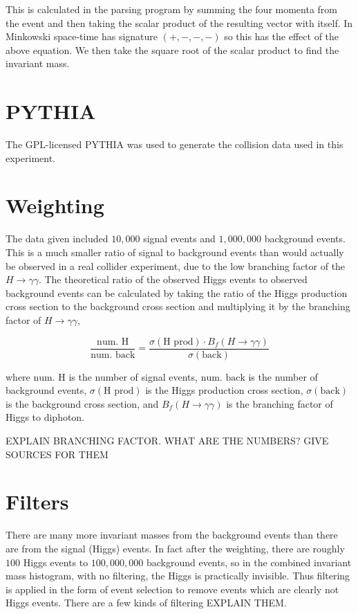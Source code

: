 \documentclass[11pt]{amsart}
\begin{document}
\begin{multicols}{2}
This is calculated in the parsing program by summing the four momenta from the event and then taking the scalar product of the resulting vector with itself. In Minkowski space-time has signature $(+, -, -, -)$ so this has the effect of the above equation. We then take the square root of the scalar product to find the invariant mass.

\section{PYTHIA}

The GPL-licensed PYTHIA was used to generate the collision data used in this experiment. \cite{pythia}

\section{Weighting}

The data given included $10,000$ signal events and $1,000,000$ background events. This is a much smaller ratio of signal to background events than would actually be observed in a real collider experiment, due to the low branching factor of the $H \to \gamma\gamma$. The theoretical ratio of the observed Higgs events to observed background events can be calculated by taking the ratio of the Higgs production cross section to the background cross section and multiplying it by the branching factor of $H \to \gamma\gamma$,

\begin{equation}
  \label{eq:weighting}
  \frac{\text{num. H}}{\text{num. back}} = \frac{\sigma{\left(\text{H prod}\right)} \cdot B_f\left(H\to\gamma\gamma\right)}{\sigma{\left(\text{back}\right)}}
\end{equation}

where $\text{num. H}$ is the number of signal events, $\text{num. back}$ is the number of background events, $\sigma{\left(\text{H prod}\right)}$ is the Higgs production cross section, $\sigma{\left(\text{back}\right)}$ is the background cross section, and $B_f\left(H\to\gamma\gamma\right)$ is the branching factor of Higgs to diphoton.

EXPLAIN BRANCHING FACTOR. WHAT ARE THE NUMBERS? GIVE SOURCES FOR THEM


\section{Filters}

There are many more invariant masses from the background events than there are from the signal (Higgs) events. In fact after the weighting, there are roughly $100$ Higgs events to $100,000,000$ background events, so in the combined invariant mass histogram, with no filtering, the Higgs is practically invisible. Thus filtering is applied in the form of event selection to remove events which are clearly not Higgs events. There are a few kinds of filtering EXPLAIN THEM.


\end{multicols}
\end{document}
